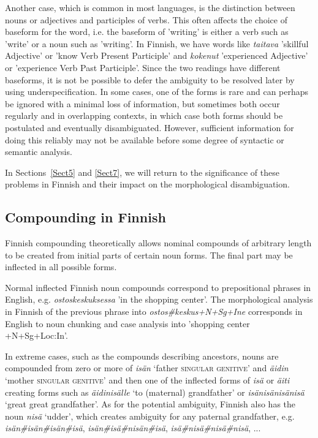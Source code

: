 \documentclass[a4paper]{article}
\begin{document}
Another case, which is common in most languages, is the distinction
between nouns or adjectives and participles of verbs. This often
affects the choice of baseform for the word, i.e. the baseform of
'writing' is either a verb such as 'write' or a noun such as
'writing'. In Finnish, we have words like {\em taitava} 'skillful
Adjective' or 'know Verb Present Participle' and {\em kokenut}
'experienced Adjective' or 'experience Verb Past Participle'. Since
the two readings have different baseforms, it is not be possible to
defer the ambiguity to be resolved later by using underspecification.
In some cases, one of the forms is rare and can perhaps be ignored
with a minimal loss of information, but sometimes both occur regularly
and in overlapping contexts, in which case both forms should be
postulated and eventually disambiguated. However, sufficient
information for doing this reliably may not be available before some
degree of syntactic or semantic analysis.

In Sections~\ref{Sect5} and \ref{Sect7}, we will return to the
significance of these problems in Finnish and their impact on the
morphological disambiguation.

\subsection{Compounding in Finnish}
\label{Sect12}

Finnish compounding theoretically allows nominal compounds of
arbitrary length to be created from initial parts of certain noun
forms. The final part may be inflected in all possible forms.

Normal inflected Finnish noun compounds correspond to prepositional
phrases in English, e.g. {\em ostoskeskuksessa} 'in the shopping
center'. The morphological analysis in Finnish of the previous phrase
into {\em ostos\#keskus+N+Sg+Ine} corresponds in English to noun
chunking and case analysis into 'shopping center +N+Sg+Loc:In'.

In extreme cases, such as the compounds describing ancestors, nouns
are compounded from zero or more of \emph{isän} `father
\textsc{singular genitive}' and \emph{äidin} `mother \textsc{singular
  genitive}' and then one of the inflected forms of \emph{isä} or
\emph{äiti} creating forms such as \emph{äidinisälle} `to (maternal)
grandfather' or \emph{isänisänisänisä} `great great grandfather'.  As
for the potential ambiguity, Finnish also has the noun \emph{nisä}
`udder', which creates ambiguity for any paternal grandfather,
e.g. \emph{isän\#isän\#isän\#isä}, \emph{isän\#isä\#nisän\#isä},
\emph{isä\#nisä\#nisä\#\-nisä}, ...
\end{document}
